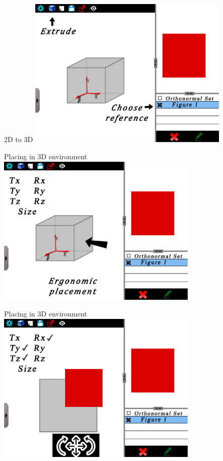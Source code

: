 \documentclass[a4paper,10pt]{beamer}
\begin{document}
			\begin{frame}{2D to 3D}
				\includegraphics[height=205pt]{maquette/maquette_4.png}
			\end{frame}
			
			\begin{frame}{Placing in 3D environment}
				\includegraphics[height=205pt]{maquette/maquette_5.png}
			\end{frame}
			
			\begin{frame}{Placing in 3D environment}
				\includegraphics[height=205pt]{maquette/maquette_6.png}
			\end{frame}
			
\end{document}
